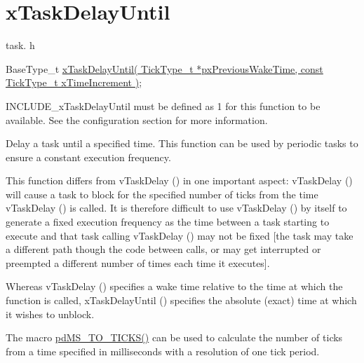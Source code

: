 \hypertarget{group__x_task_delay_until}{}\section{x\+Task\+Delay\+Until}
\label{group__x_task_delay_until}
task. h 
\begin{DoxyPre}
BaseType\_t \hyperlink{externals_2freertos_2include_2task_8h_af7ba46e730bec507c8a20d9f9b9c0e1d}{xTaskDelayUntil( TickType\_t *pxPreviousWakeTime, const TickType\_t xTimeIncrement )};
\end{DoxyPre}


I\+N\+C\+L\+U\+D\+E\+\_\+x\+Task\+Delay\+Until must be defined as 1 for this function to be available. See the configuration section for more information.

Delay a task until a specified time. This function can be used by periodic tasks to ensure a constant execution frequency.

This function differs from v\+Task\+Delay () in one important aspect\+: v\+Task\+Delay () will cause a task to block for the specified number of ticks from the time v\+Task\+Delay () is called. It is therefore difficult to use v\+Task\+Delay () by itself to generate a fixed execution frequency as the time between a task starting to execute and that task calling v\+Task\+Delay () may not be fixed \mbox{[}the task may take a different path though the code between calls, or may get interrupted or preempted a different number of times each time it executes\mbox{]}.

Whereas v\+Task\+Delay () specifies a wake time relative to the time at which the function is called, x\+Task\+Delay\+Until () specifies the absolute (exact) time at which it wishes to unblock.

The macro \hyperlink{externals_2freertos_2include_2projdefs_8h_a353d0f62b82a402cb3db63706c81ec3f}{pd\+M\+S\+\_\+\+T\+O\+\_\+\+T\+I\+C\+K\+S()} can be used to calculate the number of ticks from a time specified in milliseconds with a resolution of one tick period.


